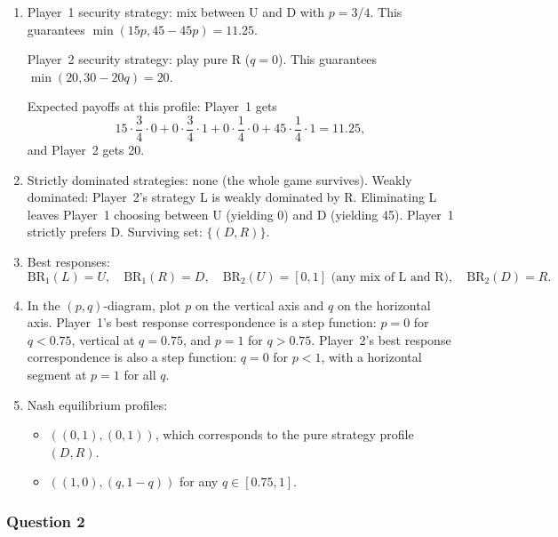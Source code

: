 \documentclass[12pt,a4paper]{article}
\begin{document}
\begin{enumerate}
  \item Player~1 security strategy: mix between U and D with \(p = 3/4\). This guarantees \(\min(15p, 45-45p) = 11.25\).

        Player~2 security strategy: play pure R (\(q=0\)). This guarantees \(\min(20, 30-20q) = 20\).

        Expected payoffs at this profile: Player~1 gets
        \[
          15\cdot\frac{3}{4}\cdot 0 + 0\cdot\frac{3}{4}\cdot 1 + 0\cdot\frac{1}{4}\cdot 0 + 45\cdot\frac{1}{4}\cdot 1 = 11.25,
        \]
        and Player~2 gets 20.

  \item Strictly dominated strategies: none (the whole game survives). Weakly dominated: Player~2's strategy L is weakly dominated by R. Eliminating L leaves Player~1 choosing between U (yielding 0) and D (yielding 45). Player~1 strictly prefers D. Surviving set: \(\{(D, R)\}\).

  \item Best responses:
        \[
          \text{BR}_1(L) = U,\quad \text{BR}_1(R) = D,\quad
          \text{BR}_2(U) = [0,1] \text{ (any mix of L and R)},\quad \text{BR}_2(D) = R.
        \]

  \item In the \((p,q)\)-diagram, plot \(p\) on the vertical axis and \(q\) on the horizontal axis. Player~1's best response correspondence is a step function: \(p=0\) for \(q<0.75\), vertical at \(q=0.75\), and \(p=1\) for \(q>0.75\). Player~2's best response correspondence is also a step function: \(q=0\) for \(p<1\), with a horizontal segment at \(p=1\) for all \(q\).

  \item Nash equilibrium profiles:
        \begin{itemize}
          \item \(((0, 1), (0, 1))\), which corresponds to the pure strategy profile \((D,R)\).
          \item \(((1, 0), (q, 1-q))\) for any \(q \in [0.75, 1]\).
        \end{itemize}
\end{enumerate}

\subsubsection*{Question 2}
\end{document}
